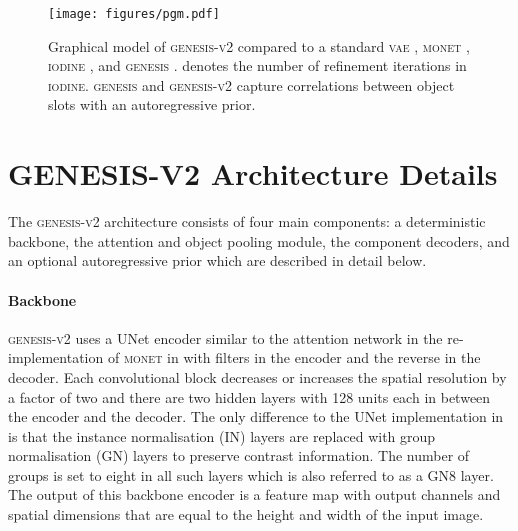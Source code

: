 \documentclass{article}
\begin{document}
\begin{figure}[h!]
	\centering
	\texttt{[image: figures/pgm.pdf]}
	\caption{Graphical model of \textsc{genesis-v2} compared to a standard \textsc{vae} \cite{kingma2013auto,rezende2014stochastic}, \textsc{monet} \cite{burgess2019monet}, \textsc{iodine} \cite{greff2019multi}, and \textsc{genesis} \cite{engelcke2020genesis}.  denotes the number of refinement iterations in \textsc{iodine}. \textsc{genesis} and \textsc{genesis-v2} capture correlations between object slots with an autoregressive prior.}
	\label{fig:pgms}
\end{figure}


\section{GENESIS-V2 Architecture Details}
\label{app:architecture}

The \textsc{genesis-v2} architecture consists of four main components: a deterministic backbone, the attention and object pooling module, the component decoders, and an optional autoregressive prior which are described in detail below.

\paragraph{Backbone}
\textsc{genesis-v2} uses a UNet \citep{ronneberger2015u} encoder similar to the attention network in the re-implementation of \textsc{monet} in \citet{engelcke2020genesis} with  filters in the encoder and the reverse in the decoder.
Each convolutional block decreases or increases the spatial resolution by a factor of two and there are two hidden layers with 128 units each in between the encoder and the decoder.
The only difference to the UNet implementation in \citet{engelcke2020genesis} is that the instance normalisation (IN) layers \citep{ulyanov2016instance} are replaced with group normalisation (GN) layers \citep{wu2018group} to preserve contrast information.
The number of groups is set to eight in all such layers which is also referred to as a GN8 layer. 
The output of this backbone encoder is a feature map  with  output channels and spatial dimensions that are equal to the height and width of the input image.
\end{document}
